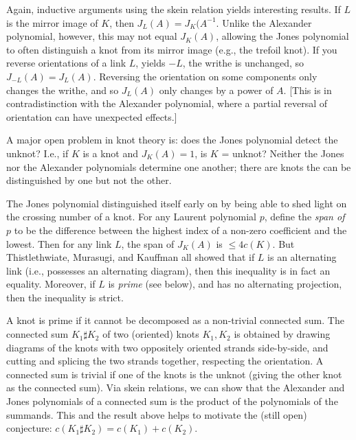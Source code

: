 \ssk

Again, inductive arguments using the skein relation yields interesting results.
If $L$ is the mirror image of $K$, then $J_L(A)=J_K(A^{-1}$. Unlike the Alexander 
polynomial, however, this may not equal $J_K(A)$, allowing the Jones polynomial 
to often distinguish a knot from its mirror image (e.g., the trefoil knot).
If you reverse  orientations of a link $L$, yields $-L$, the writhe is 
unchanged, so $J_{-L}(A)=J_L(A)$. Reversing the orientation on some components
only changes the writhe, and so $J_L(A)$ only changes by a power of $A$. [This is
in contradistinction with the Alexander polynomial, where a partial reversal of
orientation can have unexpected effects.] 

\ssk

A major open problem in knot theory is: does the Jones polynomial detect the unknot?
I.e., if $K$ is a knot and $J_K(A)=1$, is $K$ = unknot? Neither the Jones nor the Alexander
polynomials determine one another; there are knots the can be distinguished by
one but not the other.

\msk

The Jones polynomial distinguished itself early on by being able to shed light on
the crossing number of a knot. For any Laurent polynomial $p$, define the {\it span
of $p$} to be the difference between the highest index of a non-zero coefficient
and the lowest. Then for any link $L$, the span of $J_K(A)$ is $\leq 4c(K)$. But
Thistlethwiate, Murasugi, and Kauffman all showed that if $L$  is an alternating
link (i.e., possesses an alternating diagram), then this inequality is in fact
an equality. Moreover, if $L$ is {\it prime} (see below), and has no alternating
projection, then the inequality is strict.

\ssk

A knot is prime if it cannot be decomposed as a non-trivial connected sum. The 
connected sum $K_1\sharp K_2$ of two (oriented) knots $K_1,K_2$ 
is obtained by drawing diagrams of the
knots with two oppositely oriented strands side-by-side, and cutting and splicing
the two strands together, respecting the orientation. A connected sum is trivial if
one of the knots is the unknot (giving the other knot as the connected sum). Via
skein relations, we can show that the Alexander and Jones polynomials of a 
connected sum is the product of the polynomials of the summands. This and the 
result above helps to motivate the (still open) conjecture:
$c(K_1\sharp K_2)=c(K_1)+c(K_2)$.

